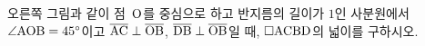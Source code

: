 \noindent\begin{minipage}[t]{0.58\linewidth}\vspace{0pt}\raggedright 오른쪽 그림과 같이 점~$\mathrm{O}$를 중심으로 하고 반지름의 길이가 $1$인 사분원에서 $\angle\mathrm{AOB}=45^\circ$이고 $\overline{\mathrm{AC}}\perp\overline{\mathrm{OB}}$, $\overline{\mathrm{DB}}\perp\overline{\mathrm{OB}}$일 때, $\square\mathrm{ACBD}$의 넓이를 구하시오.\end{minipage}\hfill\begin{minipage}[t]{0.4\linewidth}\vspace{0pt}\centering \resizebox{\ifdim\width>\linewidth\linewidth\else\width\fi}{!}{}\end{minipage}\par

